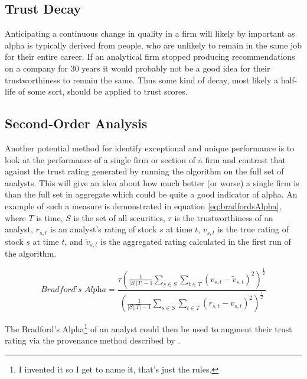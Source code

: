 \subsection{Trust Decay}
Anticipating a continuous change in quality in a firm will likely by important as alpha is typically derived from people, who are unlikely to remain in the same job for their entire career. If an analytical firm stopped producing recommendations on a company for 30 years it would probably not be a good idea for their trustworthiness to remain the same. Thus some kind of decay, most likely a half-life of some sort, should be applied to trust scores.

\subsection{Second-Order Analysis}
Another potential method for identify exceptional and unique performance is to look at the performance of a single firm or section of a firm and contrast that against the trust rating generated by running the algorithm on the full set of analysts. This will give an idea about how much better (or worse) a single firm is than the full set in aggregate which could be quite a good indicator of alpha. An example of such a measure is demonstrated in equation \ref{eq:bradfordsAlpha}, where $T$ is time, $S$ is the set of all securities, $\tau$ is the trustworthiness of an analyst, $r_{s,t}$ is an analyst's rating of stock $s$ at time $t$, $v_{s,t}$ is the true rating of stock $s$ at time $t$, and $\tilde{v}_{s,t}$ is the aggregated rating calculated in the first run of the algorithm. 

\begin{equation}
    \textit{Bradford's Alpha} = \frac{\tau \left(\frac{1}{|S||T| - 1}\sum\limits_{s\in S}\sum\limits_{t\in T}(v_{s,t} - \tilde{v}_{s,t}) ^2\right)^\frac{1}{2}}{\left(\frac{1}{|S||T| - 1}\sum\limits_{s\in S}\sum\limits_{t\in T}(r_{s,t} - v_{s,t} )^2\right)^\frac{1}{2}} \label{eq:bradfordsAlpha}
\end{equation}

The Bradford's Alpha\footnote{I invented it so I get to name it, that's just the rules.} of an analyst could then be used to augment their trust rating via the provenance method described by \textcite{rezvani2018provenance}.






